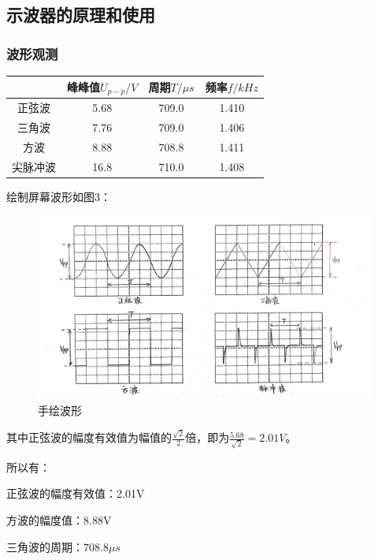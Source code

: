 \documentclass[UTF8]{ctexart}
\begin{document}
\subsection{示波器的原理和使用}

\subsubsection{波形观测}
\begin{center}
    \begin{tabular}{|c|c|c|c|}
     
        \hline  &峰峰值$U_{p-p}/V$&周期$T/ \mu s$&频率$f/kHz$\\
        \hline  正弦波&5.68&709.0&1.410\\
        \hline  三角波&7.76&709.0&1.406\\
        \hline  方波&8.88&708.8&1.411\\
        \hline  尖脉冲波&16.8&710.0&1.408\\
        \hline
    
    \end{tabular}
\end{center}

绘制屏幕波形如图3：
 
\begin{figure}[h]
    \centering
    \includegraphics[scale=0.15]{手绘波形.jpg}
    \caption{手绘波形}
    \label{fig:label}
\end{figure}


其中正弦波的幅度有效值为幅值的$\frac{ \sqrt{2}}{2}$倍，即为$\frac{5.68}{\sqrt{2}}=2.01V$。

所以有：

正弦波的幅度有效值：2.01V
 
方波的幅度值：8.88V

三角波的周期：708.8$\mu s$
\end{document}
